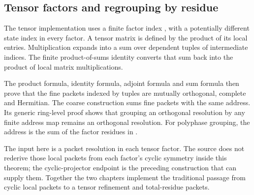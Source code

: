 \subsection{Tensor factors and regrouping by residue}
The tensor implementation uses a finite factor index , with a potentially different state index  in every factor. A tensor matrix is defined by the product of its local entries. Multiplication expands into a sum over dependent tuples of intermediate indices. The finite product-of-sums identity converts that sum back into the product of local matrix multiplications.


The product formula, identity formula, adjoint formula and sum formula then prove that the fine packets indexed by tuples are mutually orthogonal, complete and Hermitian. The coarse construction sums fine packets with the same address. Its generic ring-level proof shows that grouping an orthogonal resolution by any finite address map remains an orthogonal resolution. For polyphase grouping, the address is the sum of the factor residues in .



The input here is a packet resolution in each tensor factor. The source does not rederive those local packets from each factor's cyclic symmetry inside this theorem; the cyclic-projector endpoint is the preceding construction that can supply them. Together the two chapters implement the traditional passage from cyclic local packets to a tensor refinement and total-residue packets.
